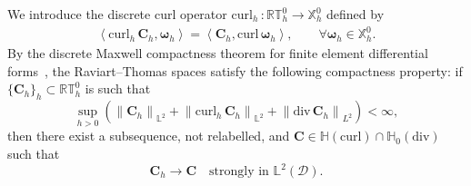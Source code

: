 \documentclass[11pt, reqno]{amsart}
\theoremstyle{definition}
\numberwithin{equation}{section}
\newcommand{\curl}{\mathrm{curl}\,}
\newcommand{\divg}{\mathrm{div}\,}
\newcommand{\bff}{\boldsymbol}
\newcommand{\bb}{\mathbb}
\newcommand{\norm}[2]{\left\|{#1}\right\|_{#2}}
\newcommand{\inpro}[2]{\left\langle#1,#2\right\rangle}
\newcommand{\hcurl}{\mathbb{H}(\mathrm{curl})}
\newcommand{\hzerodiv}{\mathbb{H}_0(\mathrm{div})}
\newcommand{\hzerocurl}{\mathbb{H}_0(\mathrm{curl})}
\newcommand{\curlh}{\mathrm{curl}_h\,}
\begin{document}
We introduce the discrete curl operator $\curlh:\bb{RT}_h^0\to\bb{X}_h^0$ defined by
\begin{align}\label{equ:stoch curlh}
	\inpro{\curlh\bff{C}_h}{\bff{\omega}_h}=\inpro{\bff{C}_h}{\curl\bff{\omega}_h},
	\qquad
	\forall \bff{\omega}_h\in\bb{X}_h^0.
\end{align}
By the discrete Maxwell compactness theorem for finite element differential
forms~\cite{HeHuXu19}, the Raviart--Thomas spaces satisfy the following compactness
property: if $\{\bff C_h\}_h\subset\bb{RT}_h^0$ is such that
\[
\sup_{h>0}
\left(
\norm{\bff C_h}{\bb L^2}
+
\norm{\curlh\bff C_h}{\bb L^2}
+
\norm{\divg\bff C_h}{L^2}
\right)<\infty,
\]
then there exist a subsequence, not relabelled, and
$\bff C\in\hcurl \cap \hzerodiv$ such that
\[
\bff C_h\to\bff C
\quad\text{strongly in }\bb L^2(\mathscr D).
\]


\end{document}
